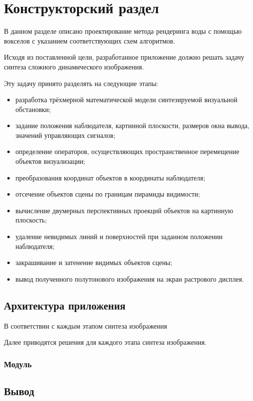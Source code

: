 \chapter{Конструкторский раздел}
\label{cha:design}

В данном разделе описано проектирование метода рендеринга воды с помощью вокселов
с указанием соответствующих схем алгоритмов.

Исходя из поставленной цели, разработанное приложение должно решать задачу
синтеза сложного динамического изображения.

Эту задачу принято разделять на следующие этапы:
\begin{itemize}
    \item разработка трёхмерной математической модели синтезируемой визуальной
    обстановки;
    \item задание положения наблюдателя, картинной плоскости, размеров окна
    вывода, значений управляющих сигналов;
    \item определение операторов, осуществляющих пространственное перемещение
    объектов визуализации;
    \item преобразования координат объектов в координаты наблюдателя;
    \item отсечение объектов сцены по границам пирамиды видимости;
    \item вычисление двумерных перспективных проекций объектов на картинную плоскость;
    \item удаление невидимых линий и поверхностей при заданном положении наблюдателя;
    \item закрашивание и затенение видимых объектов сцены;
    \item вывод полученного полутонового изображения на экран растрового дисплея.
\end{itemize}

\section{Архитектура приложения}

В соответствии с каждым этапом синтеза изображения


Далее приводятся решения для каждого этапа синтеза изображения.

\subsection{Модуль }
\section{Вывод}


